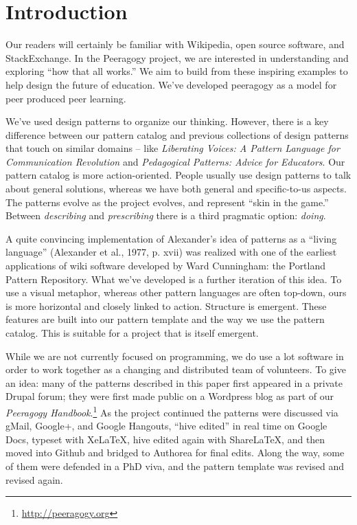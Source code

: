 \section{Introduction}

Our readers will certainly be familiar with Wikipedia, open source software, and StackExchange.  In the Peeragogy project, we are interested in understanding and exploring ``how that all works.''    We aim to build from these inspiring examples to help design the future of education.  We've developed peeragogy as a model for peer produced peer learning.

We've used design patterns to organize our thinking.  However, there is a key difference between our pattern catalog and previous collections of design patterns that touch on similar domains -- like \emph{Liberating Voices: A Pattern Language for Communication Revolution} and \emph{Pedagogical Patterns: Advice for Educators}.  Our pattern catalog is more action-oriented.  People usually use design patterns to talk about general solutions, whereas we have both general and specific-to-us aspects. The patterns evolve as the project evolves, and represent ``skin in the game.''   Between \emph{describing} and \emph{prescribing} there is a third pragmatic option: \emph{doing}.  

A quite convincing implementation of Alexander’s idea of patterns as a “living language” (Alexander et
al., 1977, p. xvii) was realized with one of the earliest applications of wiki
software developed by Ward Cunningham: the Portland Pattern Repository.
What we've developed is a further iteration of this idea. To use a visual metaphor, whereas other pattern languages are often top-down, ours is more horizontal and closely linked to action.  Structure is emergent.  These features are built into our pattern template and the way we use the pattern catalog.  This is suitable for a project
that is itself emergent.

While we are not currently focused on programming, we do use a lot software in order to work together as a changing and distributed team of volunteers.  To give an idea: many of the patterns described in this paper first appeared in a private Drupal forum; they were first made public on a Wordpress blog as part of our \emph{Peeragogy Handbook}.\footnote{\url{http://peeragogy.org}}  As the project continued the patterns were discussed via gMail, Google+, and Google Hangouts, ``hive edited'' in real time on Google Docs, typeset with XeLaTeX, hive edited again with ShareLaTeX, and then moved into Github and bridged to Authorea for final edits. Along the way, some of them were defended in a PhD viva, and the pattern template was revised and revised again. 

